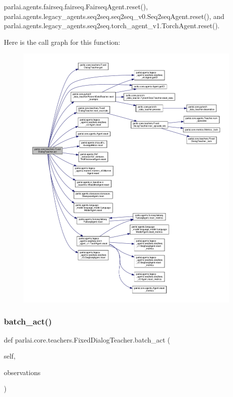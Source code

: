 parlai.\+agents.\+fairseq.\+fairseq.\+Fairseq\+Agent.\+reset(), parlai.\+agents.\+legacy\+\_\+agents.\+seq2seq.\+seq2seq\+\_\+v0.\+Seq2seq\+Agent.\+reset(), and parlai.\+agents.\+legacy\+\_\+agents.\+seq2seq.\+torch\+\_\+agent\+\_\+v1.\+Torch\+Agent.\+reset().

Here is the call graph for this function\+:
\nopagebreak
\begin{figure}[H]
\begin{center}
\leavevmode
\includegraphics[width=350pt]{classparlai_1_1core_1_1teachers_1_1FixedDialogTeacher_a759b2dcb341b657fda29c71a7a5354b4_cgraph}
\end{center}
\end{figure}
\mbox{\label{classparlai_1_1core_1_1teachers_1_1FixedDialogTeacher_afa75426a7578e8aad5b74964219345be}} 
\subsubsection{\texorpdfstring{batch\+\_\+act()}{batch\_act()}}
{\footnotesize\ttfamily def parlai.\+core.\+teachers.\+Fixed\+Dialog\+Teacher.\+batch\+\_\+act (\begin{DoxyParamCaption}\item[{}]{self,  }\item[{}]{observations }\end{DoxyParamCaption})}

